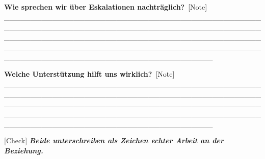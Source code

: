 \textbf{Wie sprechen wir über Eskalationen nachträglich?}\
[Note] \_\_\_\_\_\_\_\_\_\_\_\_\_\_\_\_\_\_\_\_\_\_\_\_\_\_\_\_\_\_\_\_\_\_\_\_\_\_\_\_\_\_\_\_\_\_\_\_\_\_\_\_\_\_\_\_\_\_\_\_\_\_\_\_\_\_\_\_\_\_\_\_\_\_\_\_\_\_\_\_\_\_\_\_\_\_\_\_\_\_\_\_\_\_\_\_\_\_\_\_\_\_\_\_\_\_\_\_\_\_\_\_\_\_\_\_\_\_\_\_\_\_\_\_\_\_\_\_\_\_\_\_\_\_\_\_\_\_\_\_\_\_\_\_\_\_\_\_\_\_\_\_\_\_\_\_\_\_\_\_\_\_\_\_\_\_\_\_\_\_\_\_\_\_\_\_\_\_\_\_\_\_\_\_\_\_\_\_\_\_\_\_\_\_\_\_\_\_\_\_\_\_\_\_\_\_\_\_\_\_\_\_\_\_\_\_\_\_\_\_\_\_\_\_\_\_\_\_\_\_\_

\textbf{Welche Unterstützung hilft uns wirklich?}\
[Note] \_\_\_\_\_\_\_\_\_\_\_\_\_\_\_\_\_\_\_\_\_\_\_\_\_\_\_\_\_\_\_\_\_\_\_\_\_\_\_\_\_\_\_\_\_\_\_\_\_\_\_\_\_\_\_\_\_\_\_\_\_\_\_\_\_\_\_\_\_\_\_\_\_\_\_\_\_\_\_\_\_\_\_\_\_\_\_\_\_\_\_\_\_\_\_\_\_\_\_\_\_\_\_\_\_\_\_\_\_\_\_\_\_\_\_\_\_\_\_\_\_\_\_\_\_\_\_\_\_\_\_\_\_\_\_\_\_\_\_\_\_\_\_\_\_\_\_\_\_\_\_\_\_\_\_\_\_\_\_\_\_\_\_\_\_\_\_\_\_\_\_\_\_\_\_\_\_\_\_\_\_\_\_\_\_\_\_\_\_\_\_\_\_\_\_\_\_\_\_\_\_\_\_\_\_\_\_\_\_\_\_\_\_\_\_\_\_\_\_\_\_\_\_\_\_\_\_\_\_\_\_

[Check] \emph{\textbf{Beide unterschreiben als Zeichen echter Arbeit an der Beziehung.}}
